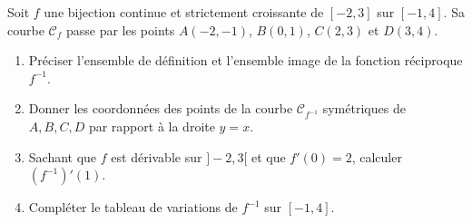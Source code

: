 \documentclass[11pt]{article}
\begin{document}
\begin{exercice}
Soit $f$ une bijection continue et strictement croissante de $[-2, 3]$ sur $[-1, 4]$. Sa courbe $\mathcal{C}_f$ passe par les points $A(-2,-1)$, $B(0,1)$, $C(2,3)$ et $D(3,4)$.
\begin{enumerate}
    \item Préciser l'ensemble de définition et l'ensemble image de la fonction réciproque $f^{-1}$.
    \item Donner les coordonnées des points de la courbe $\mathcal{C}_{f^{-1}}$ symétriques de $A, B, C, D$ par rapport à la droite $y=x$.
    \item Sachant que $f$ est dérivable sur $]-2,3[$ et que $f'(0)=2$, calculer $(f^{-1})'(1)$.
    \item Compléter le tableau de variations de $f^{-1}$ sur $[-1, 4]$.
\end{enumerate}
\end{exercice}
\end{document}
